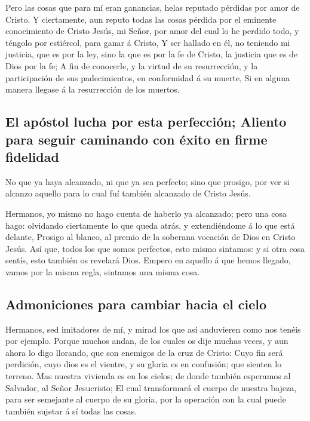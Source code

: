  Pero las cosas que para mí eran ganancias, helas reputado
pérdidas por amor de Cristo.  Y ciertamente, aun reputo
todas las cosas pérdida por el eminente conocimiento de Cristo Jesús, mi
Señor, por amor del cual lo he perdido todo, y téngolo por estiércol,
para ganar á Cristo,  Y ser hallado en él, no teniendo mi
justicia, que es por la ley, sino la que es por la fe de Cristo, la
justicia que es de Dios por la fe;  A fin de conocerle, y
la virtud de su resurrección, y la participación de sus padecimientos,
en conformidad á su muerte,  Si en alguna manera llegase
á la resurrección de los muertos.

\hypertarget{el-apuxf3stol-lucha-por-esta-perfecciuxf3n-aliento-para-seguir-caminando-con-uxe9xito-en-firme-fidelidad}{%
\subsection{El apóstol lucha por esta perfección; Aliento para seguir
caminando con éxito en firme
fidelidad}\label{el-apuxf3stol-lucha-por-esta-perfecciuxf3n-aliento-para-seguir-caminando-con-uxe9xito-en-firme-fidelidad}}

 No que ya haya alcanzado, ni que ya sea perfecto; sino
que prosigo, por ver si alcanzo aquello para lo cual fuí también
alcanzado de Cristo Jesús.

 Hermanos, yo mismo no hago cuenta de haberlo ya
alcanzado; pero una cosa hago: olvidando ciertamente lo que queda atrás,
y extendiéndome á lo que está delante,  Prosigo al
blanco, al premio de la soberana vocación de Dios en Cristo Jesús.
 Así que, todos los que somos perfectos, esto mismo
sintamos: y si otra cosa sentís, esto también os revelará Dios.
 Empero en aquello á que hemos llegado, vamos por la
misma regla, sintamos una misma cosa.

\hypertarget{admoniciones-para-cambiar-hacia-el-cielo}{%
\subsection{Admoniciones para cambiar hacia el
cielo}\label{admoniciones-para-cambiar-hacia-el-cielo}}

 Hermanos, sed imitadores de mí, y mirad los que así
anduvieren como nos tenéis por ejemplo.  Porque muchos
andan, de los cuales os dije muchas veces, y aun ahora lo digo llorando,
que son enemigos de la cruz de Cristo:  Cuyo fin será
perdición, cuyo dios es el vientre, y su gloria es en confusión; que
sienten lo terreno.  Mas nuestra vivienda es en los
cielos; de donde también esperamos al Salvador, al Señor Jesucristo;
 El cual transformará el cuerpo de nuestra bajeza, para
ser semejante al cuerpo de su gloria, por la operación con la cual puede
también sujetar á sí todas las cosas.

